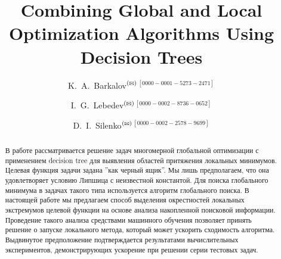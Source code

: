 \documentclass{svproc}
\def\orcidID#1{\unskip$^{[#1]}$}
\def\letter{$^{\textrm{(\Letter)}}$}
\begin{document}
\mainmatter              %
%
\title{Combining Global and Local Optimization Algorithms Using Decision Trees}
%
%
\author{K.~A.~Barkalov\letter\orcidID{0000-0001-5273-2471} \and I.~G.~Lebedev\letter\orcidID{0000-0002-8736-0652} \and D.~I.~Silenko\letter\orcidID{0000-0002-2578-9699}}
%
%
%

\maketitle              %

\begin{abstract}
В работе рассматривается решение задач многомерной глобальной оптимизации с применением decision tree для выявления областей притяжения локальных минимумов. Целевая функция задачи задана ''как черный ящик''. 
Мы лишь предполагаем, что она удовлетворяет условию Липшица с неизвестной константой. 
Для поиска глобального минимума в задачах такого типа используется алгоритм глобального поиска.
В настоящей работе мы предлагаем способ выделения окрестностей локальных экстремумов целевой функции на основе анализа накопленной поисковой информации.
Проведение такого анализа средствами машинного обучения позволяет принять решение о запуске локального метода, который может ускорить сходимость алгоритма. Выдвинутое предположение подтверждается результатами вычислительных экспериментов, демонстрирующих ускорение при решении серии тестовых задач. 
\end{abstract}
%
\end{document}
